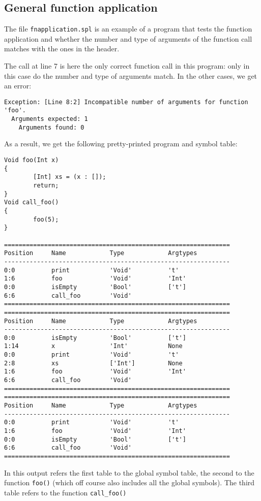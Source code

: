 \documentclass[a4paper]{article}
\begin{document}
\subsection{General function application}
The file {\tt fnapplication.spl} is an example of a program that tests the function application and whether the number and type of arguments of the function call matches with the ones in the header.

The call at line 7 is here the only correct function call in this program: only in this case do the number and type of arguments match. In the other cases, we get an error: 

\begin{verbatim}
Exception: [Line 8:2] Incompatible number of arguments for function 'foo'.
  Arguments expected: 1
    Arguments found: 0
\end{verbatim}

As a result, we get the following pretty-printed program and symbol table: 

\begin{verbatim}
Void foo(Int x)
{
        [Int] xs = (x : []);
        return;
}
Void call_foo()
{
        foo(5);
}

==============================================================
Position     Name            Type            Argtypes            
--------------------------------------------------------------
0:0          print           'Void'          't'                 
1:6          foo             'Void'          'Int'               
0:0          isEmpty         'Bool'          ['t']               
6:6          call_foo        'Void'                              
==============================================================
==============================================================
Position     Name            Type            Argtypes            
--------------------------------------------------------------
0:0          isEmpty         'Bool'          ['t']               
1:14         x               'Int'           None                
0:0          print           'Void'          't'                 
2:8          xs              ['Int']         None                
1:6          foo             'Void'          'Int'               
6:6          call_foo        'Void'                              
==============================================================
==============================================================
Position     Name            Type            Argtypes            
--------------------------------------------------------------
0:0          print           'Void'          't'                 
1:6          foo             'Void'          'Int'               
0:0          isEmpty         'Bool'          ['t']               
6:6          call_foo        'Void'                              
==============================================================
\end{verbatim}
In this output refers the first table to the global symbol table, the second to the function {\tt foo()} (which off course also includes all the global symbols). The third table refers to the function {\tt call\_foo()}
\end{document}
